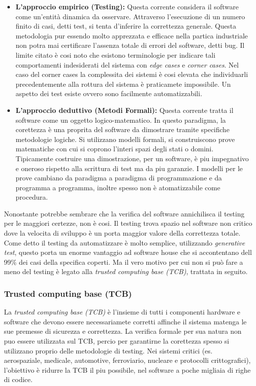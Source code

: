 \begin{itemize}
    \item \textbf{L'approccio empirico (Testing):} 
        Questa corrente considera il software come un'entità dinamica da osservare. Attraverso l'esecuzione di un numero finito di casi, detti test,
        si tenta d'inferire la correttezza generale. Questa metodologia pur essendo molto apprezzata e efficace nella partica industriale non potra
        mai certificare l'assenza totale di errori del software, detti bug. Il limite citato è cosi noto che esistono terminologie per indicare tali
        comportamenti indesiderati del sistema con \emph{edge cases} e \emph{corner cases}. Nel caso del corner cases la complessita dei sistemi è cosi
        elevata che individuarli precedentemente alla rottura del sistema è praticamete impossibile. Un aspetto dei test esiste ovvero sono facilmente
        automatizzabili.
    \item \textbf{L'approccio deduttivo (Metodi Formali):}
        Questa corrente tratta il software come un oggetto logico-matematico. In questo paradigma, la corettezza è una proprita del software da dimostrare
        tramite specifiche metodologie logiche. Si utilizzano modelli formali, si construiscono prove matematiche con cui si coprono l'interi spazi degli stati
        o domini. Tipicamente costruire una dimostrazione, per un software, è piu impegnativo e oneroso rispetto alla scrittura di test ma da piu garanzie. 
        I modelli per le prove cambiano da paradigma a paradigma di programmazione e da programma a programma, inoltre spesso non è atomatizzabile come procedura. 
\end{itemize}
Nonostante potrebbe sembrare che la verifica del software annichilisca il testing per le maggiori certezze, non è cosi. Il testing trova spazio nel software non 
critico dove la velocita di sviluppo è un porta maggior valore della correttezza totale. Come detto il testing da automatizzare è molto semplice, utilizzando 
\emph{generative test}, questo porta un enorme vantaggio ad software house che si accontentano dell 99\% dei casi della specifica coperti. Ma il vero motivo per 
cui non si può fare a meno del testing è legato alla \emph{trusted computing base (TCB)}, trattata in seguito.

\subsubsection{Trusted computing base (TCB)}
La \emph{trusted computing base (TCB)} è l'insieme di tutti i componenti hardware e software che devono essere necessariamete corretti affinche il sistema matenga
le sue premesse di sicurezza e correttezza. La verifica formale per sua natura non puo essere utilizzata sul TCB, percio per garantirne la corettezza spesso si utilizzano
proprio delle metodologie di testing. Nei sistemi critici (es. aerospaziale, medicale, automotive, ferroviario, nucleare e protocolli crittografici), l'obiettivo è ridurre 
la TCB il piu possibile, nel software a poche migliaia di righe di codice.


